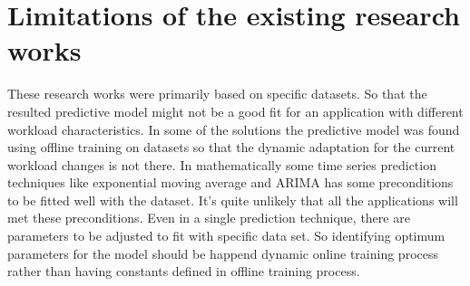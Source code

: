 \section{Limitations of the existing research works}

 These research works were primarily based on specific datasets. So that the resulted predictive model might not be a good fit for an application with different workload characteristics. In some of the solutions the predictive model was found using offline training on datasets so that the dynamic adaptation for the current workload changes is not there. 
In mathematically some time series prediction techniques like exponential moving average and ARIMA has some preconditions to be fitted well with the dataset. It’s quite unlikely that all the applications will met these preconditions. Even in a single prediction technique, there are parameters to be adjusted to fit with specific data set. So identifying optimum parameters for the model should be happend dynamic online training process rather than having constants defined in offline training process.
